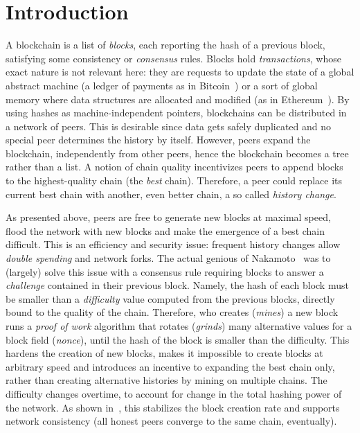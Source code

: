 \section{Introduction}\label{sec:introduction}

A blockchain is a list of \emph{blocks}, each reporting the hash
of a previous block, satisfying some consistency or \emph{consensus} rules.
Blocks hold \emph{transactions}, whose exact nature is not relevant here:
they are requests to update the state of a global abstract machine
(a ledger of payments as in Bitcoin~\cite{Nakamoto08,Antonopoulos17})
or a sort of global memory where data structures are allocated and modified
(as in Ethereum~\cite{AntonopoulosW18}).
By using hashes as machine-independent
pointers, blockchains can be distributed in a network of peers.
This is desirable since data gets safely duplicated
and no special peer determines the history by itself.
However, peers expand the blockchain, independently from other
peers, hence the blockchain becomes a tree rather than a list.
A notion of chain quality incentivizes peers to append blocks to the highest-quality chain
(the \emph{best} chain).
Therefore, a peer could replace its current best chain with another, even better chain,
a so called \emph{history change}.

As presented above, peers are free to generate new blocks at maximal speed, flood the network
with new blocks and make the emergence of a best chain difficult.
This is an efficiency and security issue: frequent history changes allow
\emph{double spending} and network forks.
The actual genious of Nakamoto~\cite{Nakamoto08} was to
(largely) solve this issue with a consensus rule requiring blocks to answer a \emph{challenge}
contained in their previous block. Namely, the hash of each block must be smaller than
a \emph{difficulty} value computed from the previous blocks, directly bound to the quality of the chain.
Therefore, who creates (\emph{mines}) a new block runs a \emph{proof of work} algorithm
that rotates (\emph{grinds}) many alternative values for a block field (\emph{nonce}), until
the hash of the block is smaller than the difficulty. This hardens the creation of new blocks,
makes it impossible to create blocks at arbitrary speed and introduces an
incentive to expanding the best chain only,
rather than creating alternative histories by mining on multiple chains.
The difficulty changes overtime, to account for change in the total hashing power
of the network. As shown in~\cite{GarayKL17}, this stabilizes the block creation rate and
supports network consistency (all honest peers converge to the same chain, eventually).

